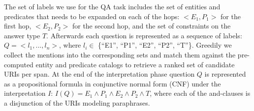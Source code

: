 






The set of labels we use for the QA task includes the set of entities and predicates that needs to be expanded on each of the hops: $<E_1, P_1>$ for the first hop, $<E_2, P_2>$ for the second hop, and the set of constraints on the answer type $T$.
Afterwards each question is represented as a sequence of labels: $Q=<l_1, ... , l_n>$, where $l_i \in$ \{``E1'', ``P1'', ``E2'', ``P2'', ``T''\}.
Greedily we collect the mentions into the corresponding sets and match them against the pre-computed entity and predicate catalogs to retrieve a ranked set of candidate URIs per span.
At the end of the interpretation phase question $Q$ is represented as a propositional formula in conjunctive normal form (CNF) under the interpretation $I$: $I(Q) = E_1 \wedge P_1 \wedge E_2 \wedge P_2 \wedge T$, where each of the and-clauses is a disjunction of the URIs modeling paraphrases.

